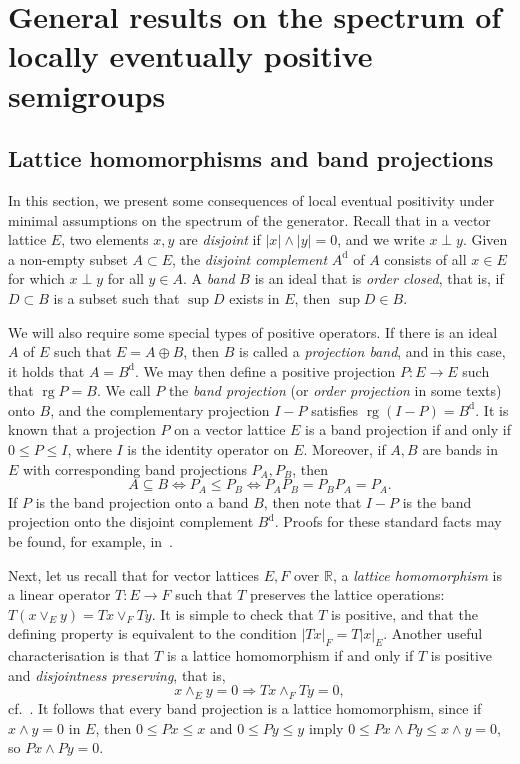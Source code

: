 \documentclass[sn-mathphys]{sn-jnl}%
\theoremstyle{thmstyleone}
\theoremstyle{thmstylethree}
\DeclareMathOperator{\rg}{rg}
\newcommand{\RR}{\mathbb{R}}
\begin{document}
\section{General results on the spectrum of locally eventually positive semigroups}\label{sec:3}

\subsection{Lattice homomorphisms and band projections}
In this section, we present some consequences of local eventual positivity under minimal assumptions on the spectrum of the generator. Recall that in a vector lattice $E$, two elements $x,y$ are \emph{disjoint} if $\lvert x\rvert\wedge \lvert y\rvert=0$, and we write $x \perp y$. Given a non-empty subset $A\subset E$, the \emph{disjoint complement} $A^{\mathrm{d}}$ of $A$ consists of all $x\in E$ for which $x\perp y$ for all $y\in A$. A \emph{band} $B$ is an ideal that is \emph{order closed}, that is, if $D\subset B$ is a subset such that $\sup D$ exists in $E$, then $\sup D \in B$.

We will also require some special types of positive operators. If there is an ideal $A$ of $E$ such that $E=A\oplus B$, then $B$ is called a \emph{projection band}, and in this case, it holds that $A=B^\mathrm{d}$. We may then define a positive projection $P : E\to E$ such that $\rg P = B$. We call $P$ the \emph{band projection} (or \emph{order projection} in some texts) onto $B$, and the complementary projection $I-P$ satisfies $\rg (I-P)=B^{\mathrm{d}}$. It is known that a projection $P$ on a vector lattice $E$ is a band projection if and only if $0 \le P \le I$, where $I$ is the identity operator on $E$. Moreover, if $A,B$ are bands in $E$ with corresponding band projections $P_A, P_B$, then
\begin{equation}
	\label{eq:band-proj}
	A\subseteq B \iff P_A \le P_B \iff P_A P_B = P_B P_A = P_A.
\end{equation}
If $P$ is the band projection onto a band $B$, then note that $I-P$ is the band projection onto the disjoint complement $B^{\mathrm{d}}$. Proofs for these standard facts may be found, for example, in~\cite[Chapter 1, Section 3]{AB}.

Next, let us recall that for vector lattices $E,F$ over $\RR$, a \emph{lattice homomorphism} is a linear operator $T:E\to F$ such that $T$ preserves the lattice operations: $T(x\vee_E y) = Tx \vee_F Ty$. It is simple to check that $T$ is positive, and that the defining property is equivalent to the condition $\lvert Tx\rvert_F = T\lvert x\rvert_E$. Another useful characterisation is that $T$ is a lattice homomorphism if and only if $T$ is positive and \emph{disjointness preserving}, that is,
\begin{equation}
	\label{eq:disjoint-preserve}
	x\wedge_E y = 0 \Rightarrow Tx \wedge_F Ty=0,
\end{equation}
cf.~\cite[Theorem 2.14]{AB}. It follows that every band projection is a lattice homomorphism, since if $x\wedge y=0$ in $E$, then $0\le Px \le x$ and $0\le Py \le y$ imply $0\le Px \wedge Py \le x\wedge y=0$, so $Px \wedge Py=0$.
\end{document}

